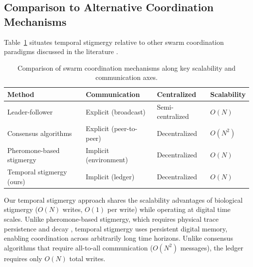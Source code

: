 \documentclass[12pt,a4paper,oneside]{report}
\begin{document}
\subsection{Comparison to Alternative Coordination Mechanisms}
\label{subsec:comparison_to_alternative_coordination_mechanisms}

Table~\ref{tab:coordination_comparison} situates temporal stigmergy relative to other swarm coordination paradigms discussed in the literature \cite{bongard2006resilient, cully2015robots, domberg2026selfadapting}.
\begin{table}[H]
\centering

\small

\setlength{\tabcolsep}{4pt}
\caption{Comparison of swarm coordination mechanisms along key scalability and communication axes.}
\label{tab:coordination_comparison}
\begin{tabular}{>{\raggedright\arraybackslash}p{4.0cm} >{\raggedright\arraybackslash}p{4.0cm} >{\centering\arraybackslash}p{2.6cm} >{\centering\arraybackslash}p{2.6cm}}
\toprule

\textbf{Method} & \textbf{Communication} & \textbf{Centralized} & \textbf{Scalability} \\
\midrule

Leader-follower & Explicit (broadcast) & Semi-centralized & $O(N)$ \\

Consensus algorithms & Explicit (peer-to-peer) & Decentralized & $O(N^2)$ \\

Pheromone-based stigmergy & Implicit (environment) & Decentralized & $O(N)$ \\

Temporal stigmergy (ours) & Implicit (ledger) & Decentralized & $O(N)$ \\
\bottomrule

\end{tabular}
\end{table}

Our temporal stigmergy approach shares the scalability advantages of biological stigmergy ($O(N)$ writes, $O(1)$ per write) while operating at digital time scales. Unlike pheromone-based stigmergy, which requires physical trace persistence and decay \cite{bongard2006resilient}, temporal stigmergy uses persistent digital memory, enabling coordination across arbitrarily long time horizons. Unlike consensus algorithms that require all-to-all communication ($O(N^2)$ messages), the ledger requires only $O(N)$ total writes.
\end{document}
